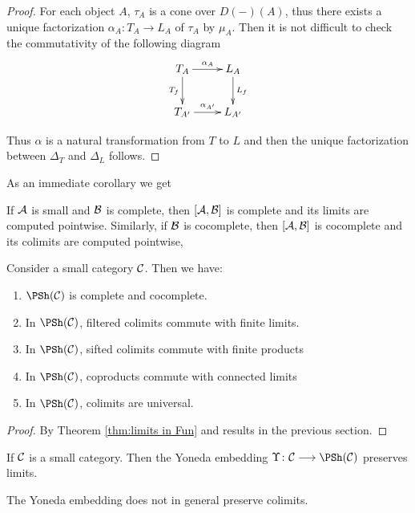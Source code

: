\begin{proof}
    For each object $A$, $\tau_A$ is a cone over $D(-)(A)$, thus there exists a unique factorization $\alpha_A\colon T_A\to L_A$ of $\tau_A$ by $\mu_A$. Then it is not difficult to check the commutativity of the following diagram
    \begin{displaymath}
      \xymatrix{
        T_A\ar[d]_{T_f}\ar[r]^{\alpha_A}
        &L_A\ar[d]^{L_f}\\
        T_{A'}\ar[r]^{\alpha_{A'}}
        &L_{A'}
        }
    \end{displaymath}

    Thus $\alpha$ is a natural transformation from $T$ to $L$ and then the unique factorization between $\Delta_T$ and $\Delta_L$ follows.
  \end{proof}

  As an immediate corollary we get
  \begin{thm}\label{thm:limits in Fun}
    If ${\cal A}$ is small and ${\cal B}$ is complete, then $[{\cal A},{\cal B}]$ is complete and its limits are computed pointwise. Similarly, if ${\cal B}$ is cocomplete, then $[{\cal A},{\cal B}]$ is cocomplete and its colimits are computed pointwise,
  \end{thm}
  \begin{cor}
    Consider a small category ${\cal C}$. Then we have:
    \begin{enumerate}
      \item $\PSh(\Cc)$ is complete and cocomplete.
      \item In $\PSh(\Cc)$, filtered colimits commute with finite limits.
      \item In $\PSh(\Cc)$, sifted colimits commute with finite products
      \item In $\PSh(\Cc)$, coproducts commute with connected limits
      \item In $\PSh(\Cc)$, colimits are universal.
    \end{enumerate}
  \end{cor}
  \begin{proof}
    By Theorem \ref{thm:limits in Fun} and results in the previous section.
  \end{proof}

  \begin{cor}
    If ${\cal C}$ is a small category. Then the Yoneda embedding $\Upsilon\colon\Cc\To\PSh(\Cc)$ preserves limits.
  \end{cor}
  \begin{rem}
    The Yoneda embedding does not in general preserve colimits.
  \end{rem}

